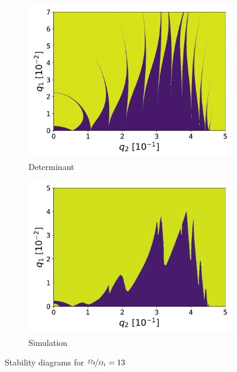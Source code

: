 \begin{figure}[H]
\begin{subfigure}{.5\textwidth}
  \centering
  \includegraphics[width=\linewidth]{img/det_q1_0.0-0.07_q2_0.0-0.5_960x960_13.pdf}
  \caption{Determinant}
  \label{fig:det_13}
\end{subfigure}%
\begin{subfigure}{.5\textwidth}
  \centering
  \includegraphics[width=\linewidth]{img/0_ions_1_electrons_q1_0.0-0.05_q2_0.0-0.5_640x640_13.pdf}  
  \caption{Simulation}
  \label{fig:sim_13}
\end{subfigure}
\caption{Stability diagrams for $\nicefrac{\Omega_2}{\Omega_1} = 13$}
\label{fig:velocityedge-eta=13}
\end{figure}

